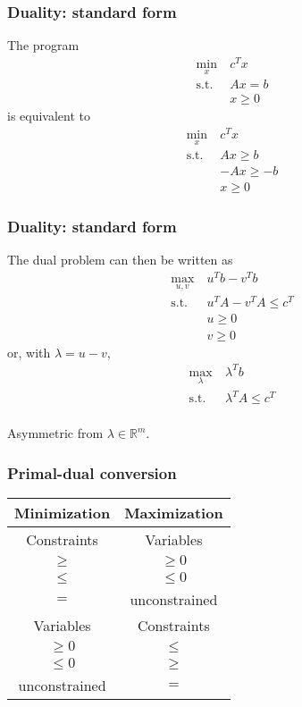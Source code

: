 \documentclass{beamer}
\def\RR{\mathcal{R}}
\def\RR{\mathbb{R}}
\begin{document}
\begin{frame}
	\frametitle{Duality: standard form}
	
	The program
	\begin{align*}
		\min_x \ & c^T x \\
		\mbox{s.t. } & Ax = b \\
		& x \geq 0
	\end{align*}
	is equivalent to
	\begin{align*}
		\min_x \ & c^T x \\
		\mbox{s.t. } & Ax \geq b \\
		& -Ax \geq -b \\
		& x \geq 0
	\end{align*}
	
\end{frame}

\begin{frame}
	\frametitle{Duality: standard form}
	
The dual problem can then be written as
	\begin{align*}
		\max_{u, v} \ & u^T b - v^T b \\
		\mbox{s.t. } & u^T A - v^T A \leq c^T \\
		& u \geq 0 \\
		& v \geq 0
	\end{align*}
	or, with $\lambda = u - v$,
	\begin{align*}
		\max_{\lambda} \ & \lambda^T b \\
		\mbox{s.t. } & \lambda^T A \leq c^T \\
	\end{align*}
	
Asymmetric from $\lambda \in \RR^m$.
	
\end{frame}


\begin{frame}
	\frametitle{Primal-dual conversion}
	
	\begin{center}
		\begin{tabular}{|c|c|}
			\hline
			\hline
			{\bf Minimization} & {\bf Maximization} \\
			\hline
			\hline
			Constraints & Variables \\
			$\geq$ & $\geq 0$ \\
			$\leq$ & $\leq 0$ \\
			$=$ & unconstrained \\
			\hline
			Variables & Constraints \\
			\hline
			$\geq 0$ & $\leq$ \\
			$\leq 0$ & $\geq$ \\
			unconstrained & $=$ \\
			\hline
		\end{tabular}
	\end{center}
	
\end{frame}
\end{document}
